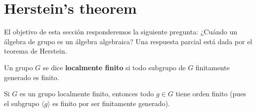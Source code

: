 %
%
%


\section*{Herstein's theorem}

El objetivo de esta sección responderemos la siguiente pregunta: ¿Cuándo un
álgebra de grupo es un álgebra algebraica? Una respuesta parcial está dada por
el teorema de Herstein. 

\begin{definition}
	Un grupo $G$ se dice \textbf{localmente finito} si todo subgrupo de $G$
	finitamente generado es finito.
\end{definition}

Si $G$ es un grupo localmente finito, entonces todo $g\in G$ tiene orden finito
(pues el subgrupo $\langle g\rangle$ es finito por ser finitamente generado). 

